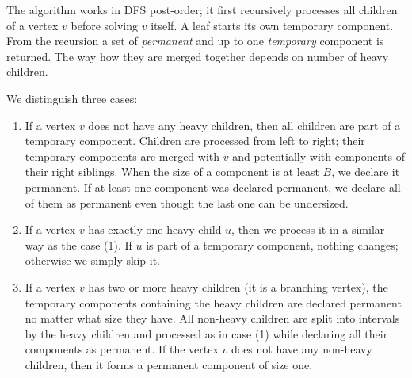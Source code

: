 The algorithm works in DFS post-order; it first recursively processes all children of a vertex $v$ before solving $v$ itself.
A leaf starts its own temporary component.
From the recursion a set of \emph{permanent} and up to one \emph{temporary} component is returned.
The way how they are merged together depends on number of heavy children.

We distinguish three cases:
\begin{enumerate}
	\item If a vertex $v$ does not have any heavy children, then all children are part of a temporary component.
	Children are processed from left to right; their temporary components are merged with $v$ and potentially with components of their right siblings.
	When the size of a component is at least $B$, we declare it permanent.
	If at least one component was declared permanent, we declare all of them as permanent even though the last one can be undersized.
	\item If a vertex $v$ has exactly one heavy child $u$, then we process it in a similar way as the case (1).
	If $u$ is part of a temporary component, nothing changes; otherwise we simply skip it.
	\item If a vertex $v$ has two or more heavy children (it is a branching vertex), the temporary components containing the heavy children are declared permanent no matter what size they have.
	All non-heavy children are split into intervals by the heavy children and processed as in case (1) while declaring all their components as permanent.
	If the vertex $v$ does not have any non-heavy children, then it forms a permanent component of size one.
\end{enumerate}

